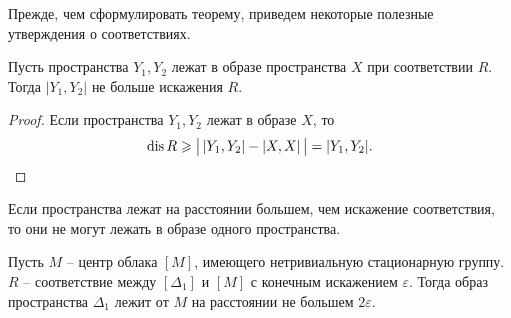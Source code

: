 Прежде, чем сформулировать теорему, приведем некоторые полезные
утверждения о соответствиях.
\begin{lemma}
  Пусть пространства \( Y_1, Y_2 \) лежат в образе пространства \( X
  \) при соответствии \( R \). Тогда \( | Y_1, Y_2 | \) не больше
  искажения \( R \).
  \label{lemDiamImage}
\end{lemma}
\begin{proof}
  Если пространства $Y_{1}, Y_{2}$ лежат в образе $X$, то
  \[\operatorname{dis} R \geqslant \big|\left|Y_{1},Y_{2}\right| - \left|X,X\right|\big|
  = |Y_{1}, Y_{2}|.\]
\end{proof}

\begin{corollary}
  Если пространства лежат на расстоянии большем, чем
  искажение соответствия, то они не могут лежать
  в образе одного пространства.
\end{corollary}
\begin{theorem}
  Пусть $M$ -- центр облака $[M]$, имеющего нетривиальную
  стационарную группу. $R$ -- соответствие между $[\Delta_{1}]$ и
  $[M]$ с конечным
  искажением $\varepsilon$. Тогда образ пространства $\Delta_{1}$
  лежит от $M$ на
  расстоянии не большем $2 \varepsilon$.
  \label{thrmCenterImage}
\end{theorem}
